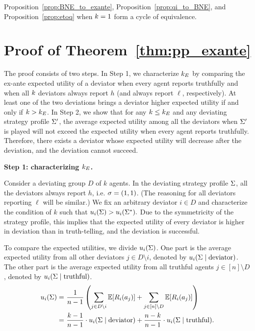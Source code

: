 Proposition~\ref{prop:BNE_to_exante}, Proposition~\ref{prop:qi_to_BNE}, and Proposition~\ref{prop:etoq} when $k = 1$ form a cycle of equivalence.

\section{Proof of Theorem~\ref{thm:pp_exante}}
\label{apx:exante}
    The proof consists of two steps. In Step 1, we characterize $k_E$ by comparing the ex-ante expected utility of a deviator when every agent reports truthfully and when all $k$ deviators always report $h$ (and always report $\ell$, respectively). At least one of the two deviations brings a deviator higher expected utility if and only if $k > k_E$. In Step 2, we show that for any $k \le k_E$ and any deviating strategy profile $\Sigma'$, the average expected utility among all the deviators when $\Sigma'$ is played will not exceed the expected utility when every agent reports truthfully. Therefore, there exists a deviator whose expected utility will decrease after the deviation, and the deviation cannot succeed. 
    


    \noindent\textbf{Step 1: characterizing $k_E$. } 

    Consider a deviating group $D$ of $k$ agents. In the deviating strategy profile $\Sigma$, all the deviators always report $h$, i.e. $\sigma = (1, 1)$. (The reasoning for all deviators reporting $\ell$ will be similar.) We fix an arbitrary deviator $i \in D$ and characterize the condition of $k$ such that $u_i(\Sigma) > u_i(\Sigma^*). $ Due to the symmetricity of the strategy profile, this implies that the expected utility of every deviator is higher in deviation than in truth-telling, and the deviation is successful. 

    To compare the expected utilities, we divide $u_i(\Sigma)$. One part is the average expected utility from all other deviators $j \in D\setminus{i}$, denoted by $u_i(\Sigma\mid \text{deviator})$. The other part is the average expected utility from all truthful agents $j \in [n]\setminus D$, denoted by $u_i(\Sigma\mid \text{truthful})$. 
    \begin{align*}
    u_i(\Sigma) =&\
    \frac{1}{n -1}\left(\sum_{j \in D\setminus{i}} \mathbb{E}[R_i(a_j)] + \sum_{j \in [n]\setminus D} \mathbb{E}[R_i(a_j)]\right)\\ 
     =&\  \frac{k-1}{n -1}\cdot u_i(\Sigma\mid \text{deviator}) + \frac{n - k}{n -1}\cdot u_i(\Sigma\mid \text{truthful}).  
\end{align*}

